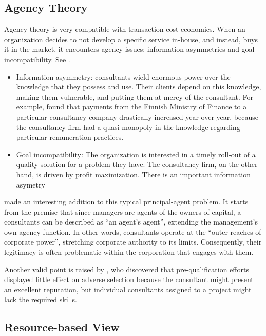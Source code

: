 \documentclass[12pt]{article}
\providecommand{\tightlist}{%
  \setlength{\itemsep}{0pt}\setlength{\parskip}{0pt}}
\begin{document}
\hypertarget{agency-theory}{%
\subsection{Agency Theory}\label{agency-theory}}

Agency theory is very compatible with transaction cost economics. When
an organization decides to not develop a specific service in-house, and
instead, buys it in the market, it encounters agency issues: information
asymmetries and goal incompatibility. See \citet{shapiro2005}.

\begin{itemize}
\tightlist
\item
  Information asymmetry: consultants wield enormous power over the
  knowledge that they possess and use. Their clients depend on this
  knowledge, making them vulnerable, and putting them at mercy of the
  consultant. \citep{brien1998} For example, \citet[248-249]{ylonen2019}
  found that payments from the Finnish Ministry of Finance to a
  particular consultancy company drastically increased year-over-year,
  because the consultancy firm had a quasi-monopoly in the knowledge
  regarding particular remuneration practices.
\item
  Goal incompatibility: The organization is interested in a timely
  roll-out of a quality solution for a problem they have. The
  consultancy firm, on the other hand, is driven by profit maximization.
  There is an important information asymetry
\end{itemize}

\citet{fincham2002} made an interesting addition to this typical
principal-agent problem. It starts from the premise that since managers
are agents of the owners of capital, a consultants can be described as
``an agent's agent'', extending the management's own agency function. In
other words, consultants operate at the ``outer reaches of corporate
power'', stretching corporate authority to its limits. Consequently,
their legitimacy is often problematic within the corporation that
engages with them.

Another valid point is raised by \citet[23]{basu2011} , who discovered
that pre-qualification efforts displayed little effect on adverse
selection because the consultant might present an excellent reputation,
but individual consultants assigned to a project might lack the required
skills.

\hypertarget{resource-based-view}{%
\subsection{Resource-based View}\label{resource-based-view}}
\end{document}
